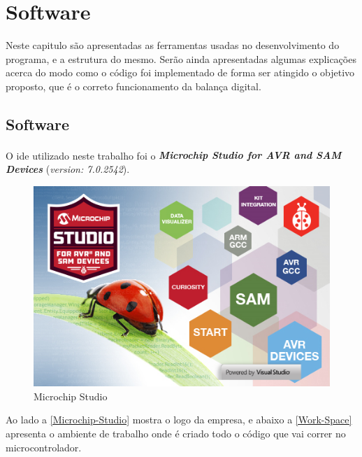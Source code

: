 \chapter{Software}
Neste capitulo são apresentadas as ferramentas usadas no desenvolvimento do programa, e a estrutura do mesmo. Serão ainda apresentadas algumas explicações acerca do modo como o código foi implementado de forma ser atingido o objetivo proposto, que é o correto funcionamento da balança digital.
\newpage
\section{Software}
O \ac{ide} utilizado neste trabalho foi o \textbf{\textit{{Microchip Studio for AVR\textsuperscript{\textregistered} and SAM Devices}}} (\textit{version: 7.0.2542}).
\emptyline
\begin{minipage}[!b]{.55\linewidth}
	\begin{figure}[H]
		\captionsetup{justification=raggedright,singlelinecheck=false}
		\includegraphics[scale=0.55]{./image/PESTA/IDE/Microchip-Studio.png}
		\caption{Microchip Studio}
		\label{Microchip-Studio}
	\end{figure}
\end{minipage}
\begin{minipage}[!b]{.45\linewidth}
	Ao lado a \autoref{Microchip-Studio} mostra o logo da empresa, e abaixo a \autoref{Work-Space} apresenta o ambiente de trabalho onde é criado todo o código que vai correr no microcontrolador.
\emptyline
\end{minipage}
